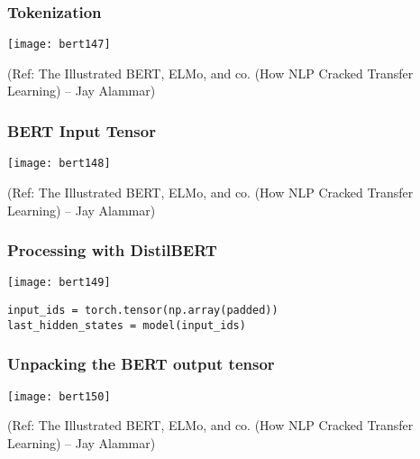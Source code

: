 \begin{frame}[fragile]\frametitle{Tokenization}


			\begin{center}
			\texttt{[image: bert147]}
			\end{center}	

{\tiny (Ref: The Illustrated BERT, ELMo, and co. (How NLP Cracked Transfer Learning) – Jay Alammar)}

\end{frame}

\begin{frame}[fragile]\frametitle{BERT Input Tensor}

			\begin{center}
			\texttt{[image: bert148]}
			\end{center}	

{\tiny (Ref: The Illustrated BERT, ELMo, and co. (How NLP Cracked Transfer Learning) – Jay Alammar)}

\end{frame}

\begin{frame}[fragile]\frametitle{Processing with DistilBERT}



			\begin{center}
			\texttt{[image: bert149]}
			\end{center}	

\begin{lstlisting}
input_ids = torch.tensor(np.array(padded))
last_hidden_states = model(input_ids)
\end{lstlisting}



\end{frame}

\begin{frame}[fragile]\frametitle{Unpacking the BERT output tensor}

			\begin{center}
			\texttt{[image: bert150]}
			\end{center}	

{\tiny (Ref: The Illustrated BERT, ELMo, and co. (How NLP Cracked Transfer Learning) – Jay Alammar)}

\end{frame}

